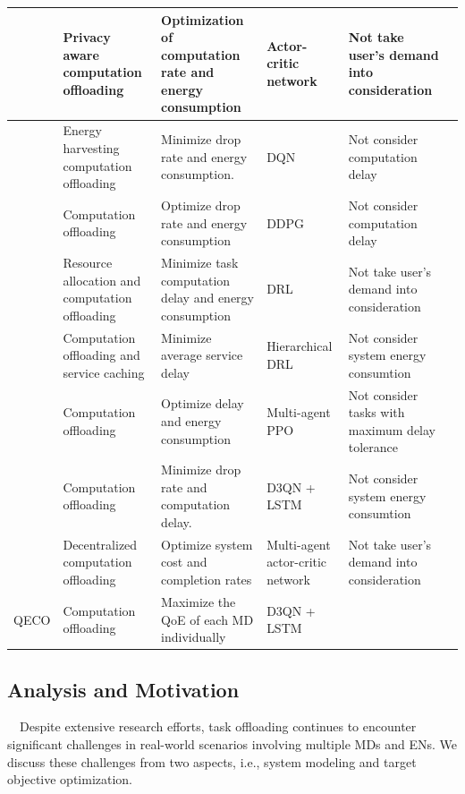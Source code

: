 \documentclass[12pt,draftclsnofoot,onecolumn]{IEEEtran}
\newenvironment{my}[2]%
{\begin{list}{}%
{\setlength{\rightmargin}{#1}\setlength{\leftmargin}{#2}}%


 \item[]{}

} {\end{list}}
\begin{document}
\begin{enumerate}
\begin{my}{1cm}{1cm}
{\begin{table}[tbp]
{{\begin{tabular}{ lp{7cm}p{6cm}p{4cm}p{6cm}l}
						\cite{wu2024combining}   & Privacy aware computation offloading & Optimization of computation rate and energy consumption  & Actor-critic network  & Not take user's demand into consideration \\\midrule
						\cite{Bolourian-WCL24}  & Energy harvesting  computation offloading & Minimize drop rate and energy consumption.  & DQN & Not consider computation delay  \\\midrule
						\cite{huang2021deadline}  & Computation offloading & Optimize drop rate and energy consumption & DDPG & Not consider computation delay \\ \midrule
						\cite{gong2022edge} & Resource allocation and computation offloading & Minimize task computation delay and energy consumption  & DRL & Not take user's demand into consideration\\\midrule
						\cite{sun2024hierarchical} & Computation offloading and service caching & Minimize average service delay & Hierarchical DRL & Not consider system energy consumtion \\\midrule
						\cite{wu2023multi}  & Computation offloading & Optimize delay and energy consumption  & Multi-agent PPO&  Not consider tasks with maximum delay tolerance \\\midrule
						\cite{9253665}  &  Computation offloading & Minimize drop rate and computation delay.  & D3QN + LSTM & Not consider system energy consumtion\\\midrule
						\cite{gao2022large}  & Decentralized computation offloading & Optimize system cost and completion rates  & Multi-agent actor-critic network& Not take user's demand into consideration \\\midrule
						QECO  &  Computation offloading & Maximize the QoE of each MD individually & D3QN + LSTM & \\
						\toprule
				\end{tabular}}
				\label{table1}}
		\end{table}
		\subsection{Analysis and Motivation}
		\,\,\,\,
		Despite extensive research efforts, task offloading continues to encounter significant challenges in real-world scenarios involving multiple MDs and ENs. We discuss these challenges from two aspects, i.e., system modeling and target objective optimization. \vspace{3mm}
		
}
\end{my}
\end{enumerate}
\end{document}
